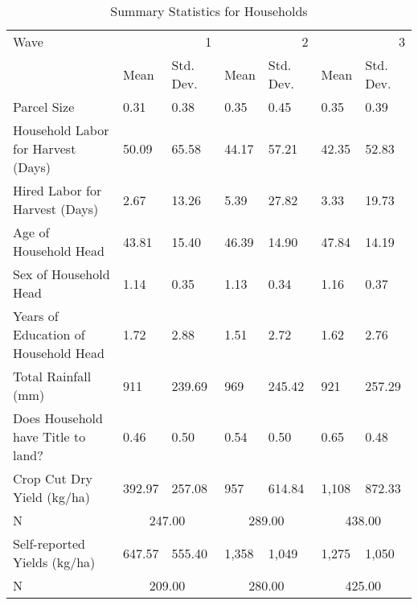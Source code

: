 \begin{table}
\caption{Summary Statistics for Households}
\label{tbl:summary}
\begin{tabular}{lllllll}
\toprule
Wave & \multicolumn{2}{r}{1} & \multicolumn{2}{r}{2} & \multicolumn{2}{r}{3} \\
 & Mean & Std. Dev. & Mean & Std. Dev. & Mean & Std. Dev. \\
\midrule
Parcel Size & 0.31 & 0.38 & 0.35 & 0.45 & 0.35 & 0.39 \\
Household Labor for Harvest (Days) & 50.09 & 65.58 & 44.17 & 57.21 & 42.35 & 52.83 \\
Hired Labor for Harvest (Days) & 2.67 & 13.26 & 5.39 & 27.82 & 3.33 & 19.73 \\
Age of Household Head & 43.81 & 15.40 & 46.39 & 14.90 & 47.84 & 14.19 \\
Sex of Household Head & 1.14 & 0.35 & 1.13 & 0.34 & 1.16 & 0.37 \\
Years of Education of Household Head & 1.72 & 2.88 & 1.51 & 2.72 & 1.62 & 2.76 \\
Total Rainfall (mm) & 911 & 239.69 & 969 & 245.42 & 921 & 257.29 \\
Does Household have Title to land? & 0.46 & 0.50 & 0.54 & 0.50 & 0.65 & 0.48 \\
Crop Cut Dry Yield (kg/ha) & 392.97 & 257.08 & 957 & 614.84 & 1,108 & 872.33 \\
\midrule
N & \multicolumn{2}{c}{247.00}&\multicolumn{2}{c}{289.00}&\multicolumn{2}{c}{438.00}\\
\midrule
Self-reported Yields (kg/ha) & 647.57 & 555.40 & 1,358 & 1,049 & 1,275 & 1,050 \\
N & \multicolumn{2}{c}{209.00}&\multicolumn{2}{c}{280.00}&\multicolumn{2}{c}{425.00}\\
\bottomrule
\end{tabular}
\end{table}
